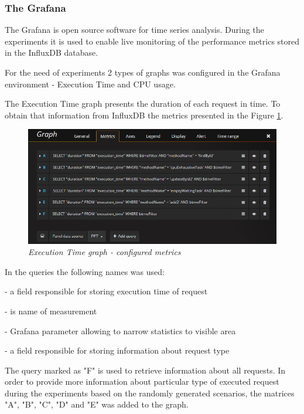 \documentclass[12pt,a4paper]{article}
\let\tempone\itemize
\let\temptwo\enditemize
\renewenvironment{itemize}{\tempone\addtolength{\itemsep}{-0.4\baselineskip}}{\temptwo}
\begin{document}
\subsubsection{The Grafana}

The Grafana is open source software for time series analysis. During the experiments it is used to enable live monitoring of the performance metrics stored in the InfluxDB database. 

For the need of experiments 2 types of graphs was configured in the Grafana environment - Execution Time and CPU usage. 

The Execution Time graph presents the duration of each request in time. To obtain that information from InfluxDB the metrics presented in the Figure \ref{figure:grafanametricsexecution}. 

\begin{figure}[!htb]
\centering
\includegraphics[width=1\textwidth]{grafanametricsexecution}
\caption{\textit{Execution Time graph - configured metrics}} \label{figure:grafanametricsexecution}
\end{figure}

In the queries the following names was used: 
\begin{itemize}
\item[duration] - a field responsible for storing execution time of request
\item[execution\_time] - is name of measurement
\item[\$timeFilter] - Grafana parameter allowing to narrow statistics to visible area
\item[methodName] - a field responsible for storing information about request type
\end{itemize} 

The query marked as "F" is used to retrieve information about all requests. 
In order to provide more information about particular type of executed request during the experiments based on the randomly generated scenarios, the matrices  "A", "B", "C", "D" and "E" was added to the graph. 
\end{document}
